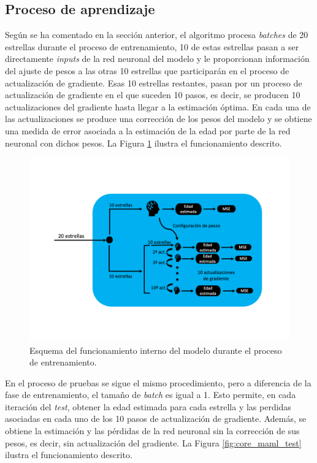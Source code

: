 \subsection{Proceso de aprendizaje} 

Según se ha comentado en la sección anterior, el algoritmo procesa \emph{batches} de 20 estrellas durante el proceso de entrenamiento, 10 de estas estrellas pasan a ser directamente \emph{inputs} de la red neuronal del modelo y le proporcionan información del ajuste de pesos a las otras 10 estrellas que participarán en el proceso de actualización de gradiente. Esas 10 estrellas restantes, pasan por un proceso de actualización de gradiente en el que suceden 10 pasos, es decir, se producen 10 actualizaciones del gradiente hasta llegar a la estimación óptima. En cada una de las actualizaciones se produce una corrección de los pesos del modelo y se obtiene una medida de error asociada a la estimación de la edad por parte de la red neuronal con dichos pesos. La Figura \ref{fig:core_maml_train} ilustra el funcionamiento descrito.

\begin{figure}[H]
\begin{center}
 \includegraphics[width=0.8\linewidth]{Figuras/MAML/maml_core_train.pdf}
\end{center}
\caption{Esquema del funcionamiento interno del modelo durante el proceso de entrenamiento.}
 \label{fig:core_maml_train}
\end{figure}

En el proceso de pruebas se sigue el mismo procedimiento, pero a diferencia de la fase de entrenamiento, el tamaño de \emph{batch} es igual a 1. Esto permite, en cada iteración del \emph{test}, obtener la edad estimada para cada estrella y las perdidas asociadas en cada uno de los 10 pasos de actualización de gradiente. Además, se obtiene la estimación y las pérdidas de la red neuronal sin la corrección de sus pesos, es decir, sin actualización del gradiente. La Figura \ref{fig:core_maml_test} ilustra el funcionamiento descrito.

